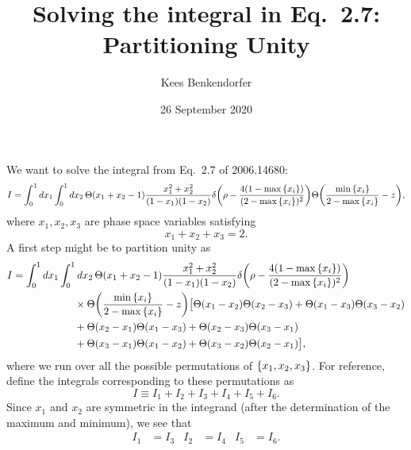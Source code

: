 \documentclass[11pt,twoside,reqno]{amsart}
\title{Solving the integral in Eq.\ 2.7: Partitioning Unity}
\author{Kees Benkendorfer}
\date{26 September 2020}
\theoremstyle{plain}
\theoremstyle{remark}
\theoremstyle{definition}
\theoremstyle{remark}
\theoremstyle{definition}
\theoremstyle{definition}
\begin{document}
\maketitle

We want to solve the integral from Eq.\ 2.7 of 2006.14680:
\begin{equation}
	I = \int_0^1 dx_1 \int_0^1 dx_2 \, \Theta(x_1 + x_2 - 1) \frac{x_1^2 + x_2^2}{(1 - x_1)(1 - x_2)} \delta \qty(\rho - \frac{4(1 - \max\qty{x_i})}{(2 - \max\qty{x_i})^2}) \Theta\qty(\frac{\min\qty{x_i}}{2 - \max\qty{x_i}} - z),
\end{equation}
where $x_1, x_2, x_3$ are phase space variables satisfying
\begin{equation}
	x_1 + x_2 + x_3 = 2.
\end{equation}
A first step might be to partition unity as
\begin{equation}
\begin{aligned}
	I &= \int_0^1 dx_1 \int_0^1 dx_2\, \Theta(x_1 + x_2 - 1) \frac{x_1^2 + x_2^2}{(1 - x_1)(1 - x_2)} \delta \qty(\rho - \frac{4(1 - \max\qty{x_i})}{(2 - \max\qty{x_i})^2}) \\
		&\qquad\qquad\qquad \times \Theta\qty(\frac{\min\qty{x_i}}{2 - \max\qty{x_i}} - z) \big[\Theta(x_1 - x_2)\Theta(x_2 - x_3) + \Theta(x_1 - x_3)\Theta(x_3 - x_2) \\
		&\qquad\qquad\qquad + \Theta(x_2 - x_1)\Theta(x_1 - x_3) + \Theta(x_2 - x_3)\Theta(x_3 - x_1) \\
		&\qquad\qquad\qquad + \Theta(x_3 - x_1)\Theta(x_1 - x_2) + \Theta(x_3 - x_2)\Theta(x_2 - x_1) \big],
\end{aligned}
\end{equation}
where we run over all the possible permutations of $\qty{x_1, x_2, x_3}$. For reference, define the integrals corresponding to these permutations as
\begin{equation}
	I \equiv I_1 + I_2 + I_3 + I_4 + I_5 + I_6.
\end{equation}
Since $x_1$ and $x_2$ are symmetric in the integrand (after the determination of the maximum and minimum), we see that
\begin{align}
	I_1 &= I_3 & I_2 &= I_4 & I_5 &= I_6.
\end{align}
\end{document}

